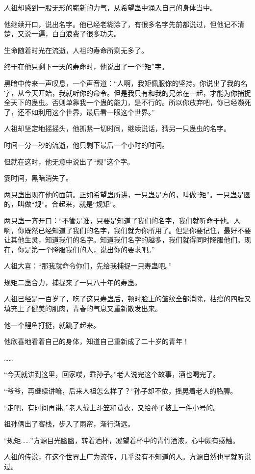 \begin{this_body}
人祖却感到一股无形的崭新的力气，从希望蛊中涌入自己的身体当中。

他继续开口，说出名字。他已经老糊涂了，有很多名字先前都说过，但他记不清楚，又说一遍，白白浪费了很多功夫。

生命随着时光在流逝，人祖的寿命所剩无多了。

终于在他只剩下一天的寿命时，他说出了一个“矩”字。

黑暗中传来一声叹息，一个声音道：“人啊，我矩佩服你的坚持。你说出了我的名字，从今天开始，我就听你的命令。但是我只有和我的兄弟在一起，才能为你捕捉全天下的蛊虫。否则单靠我一个蛊的能力，是不行的。所以你放弃吧，你已经濒死了，还不如利用这个世界，最后看一眼这个世界。”

人祖却坚定地摇摇头，他抓紧一切时间，继续说话，猜另一只蛊虫的名字。

时间一分一秒的流逝，他只剩下最后一个小时的时间。

但就在这时，他无意中说出了“规”这个字。

霎时间，黑暗消失了。

两只蛊出现在他的面前。正如希望蛊所讲，一只蛊是方的，叫做“矩”。一只蛊是圆的，叫做“规”。合起来，就是“规矩”。

两只蛊一齐开口：“不管是谁，只要是知道了我们的名字，我们就听命于他。人啊，你既然已经知道了我们的名字，我们就为你所用了。但是你要记住，最好不要让其他生灵，知道我们的名字。知道我们名字的越多，我们就得同时降服他们。现在，你是第一个降服我们的人，说出你的要求吧。”

人祖大喜：“那我就命令你们，先给我捕捉一只寿蛊吧。”

规矩二蛊合力，捕捉来了一只八十年的寿蛊。

人祖已经是一百岁了，吃了这只寿蛊后，顿时脸上的皱纹全部消除，枯瘦的四肢又填充上了健美的肌肉，青春的气息又重新散发出来。

他一个鲤鱼打挺，就跳了起来。

他欣喜地看着自己的身体，知道自己重新成了二十岁的青年！

……

“今天就讲到这里，回家喽，乖孙子。”老人说完这个故事，酒也喝完了。

“爷爷，再继续讲嘛，后来人祖怎么样了？”孙子却不依，摇晃着老人的胳膊。

“走吧，有时间再讲。”老人戴上斗笠和蓑衣，又给孙子披上一件小号的。

祖孙俩出了客栈，步入了雨帘，渐行渐远。

“规矩……”方源目光幽幽，转着酒杯，凝望着杯中的青竹酒液，心中颇有感触。

人祖的传说，在这个世界上广为流传，几乎没有不知道的人。方源自然也早就听说过。


\end{this_body}

